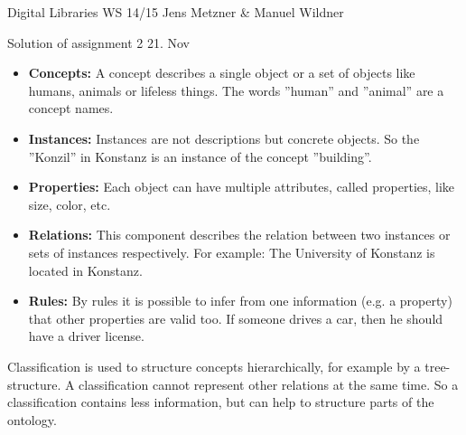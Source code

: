 \documentclass[10pt,a4paper]{scrartcl}
\begin{document}
\uebkopfzeile
  {Digital Libraries} %
  {WS 14/15}  %
  {}    %
  {Jens Metzner \& Manuel Wildner}    %

\uebtitel
{Solution of assignment 2} %
{21. Nov} %


\begin{itemize}
	\item \textbf{Concepts:} A concept describes a single object or a set of objects like humans, animals or lifeless things. The words ''human'' and ''animal'' are a concept names.
	\item \textbf{Instances:} Instances are not descriptions but concrete objects. So the ''Konzil'' in Konstanz is an instance of the concept ''building''.
	\item \textbf{Properties:} Each object can have multiple attributes, called properties, like size, color, etc.
	\item \textbf{Relations:} This component describes the relation between two instances or sets of instances respectively. For example: The University of Konstanz is located in Konstanz.
	\item \textbf{Rules:} By rules it is possible to infer from one information (e.g. a property) that other properties are valid too. If someone drives a car, then he should have a driver license.
\end{itemize}
Classification is used to structure concepts hierarchically, for example by a tree-structure. A classification cannot represent other relations at the same time. So a classification contains less information, but can help to structure parts of the ontology.





\end{document}
